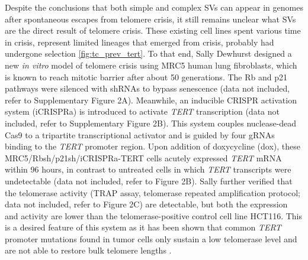 \documentclass[phd,tocprelim]{cornell}
\renewcommand{\caption}[1]{\singlespacing\hangcaption{#1}\normalspacing}
\begin{document}


Despite the conclusions that both simple and complex SVs can appear in genomes after spontaneous escapes from telomere crisis, it still remains unclear what SVs are the direct result of telomere crisis. These existing cell lines spent various time in crisis, represent limited lineages that emerged from crisis, probably had undergone selection \ref{fig:tc_prev_tert}. To that end, Sally Dewhurst designed a new \textit{in vitro} model of telomere crisis using MRC5 human lung fibroblasts, which is known to reach mitotic barrier after about 50 generations. The Rb and p21 pathways were silenced with shRNAs to bypass senescence (data not included, refer to \cite{Dewhurst2021-jk} Supplementary Figure 2A). Meanwhile, an inducible CRISPR activation system (iCRISPRa) is introduced to activate \textit{TERT} transcription (data not included, refer to \cite{Dewhurst2021-jk} Supplementary Figure 2B). This system couples nuclease-dead Cas9 to a tripartite transcriptional activator and is guided by four gRNAs binding to the \textit{TERT} promoter region. Upon addition of doxycycline (dox), these MRC5/Rbsh/p21sh/iCRISPRa-TERT cells acutely expressed \textit{TERT} mRNA within 96 hours, in contrast to untreated cells in which \textit{TERT} transcripts were undetectable (data not included, refer to \cite{Dewhurst2021-jk} Figure 2B). Sally further verified that the telomerase activity (TRAP assay, telomerase repeated amplification protocol; data not included, refer to \cite{Dewhurst2021-jk} Figure 2C) are detectable, but both the expression and activity are lower than the telomerase-positive control cell line HCT116. This is a desired feature of this system as it has been shown that common \textit{TERT} promoter mutations found in tumor cells only sustain a low telomerase level and are not able to restore bulk telomere lengths \cite{Chiba2017-gq}.
\end{document}
